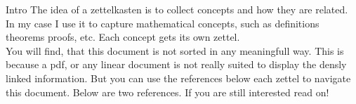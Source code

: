 \documentclass[class=article, crop=false]{standalone}
\begin{document}
\begin{zettel}{Intro}
The idea of a zettelkasten is to collect concepts and how they are related. In my case I use it to capture mathematical concepts, such as definitions theorems proofs, etc. Each concept gets its own zettel.\\

You will find, that this document is not sorted in any meaningfull way. This is because a pdf, or any linear document is not really suited to display the densly linked information. But you can use the references below each zettel to navigate this document.
Below are two references. If you are still interested read on!

\end{zettel}
\end{document}
